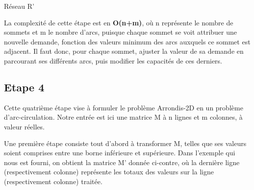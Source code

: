 \documentclass[letterpaper,12pt]{article}
\begin{document}
\begin{center}

Réseau R'
\end{center}

La complexité de cette étape est en \textbf{O(n+m)}, où n représente le nombre de sommets et m le nombre d'arcs, puisque chaque sommet se voit attribuer une nouvelle demande, fonction des valeurs minimum des arcs auxquels ce sommet est adjacent. Il faut donc, pour chaque sommet, ajuster la valeur de sa demande en parcourant ses différents arcs, puis modifier les capacités de ces derniers.

\subsection{Etape 4}

Cette quatrième étape vise à formuler le problème Arrondis-2D en un problème d'arc-circulation.
Notre entrée est ici une matrice M à n lignes et m colonnes, à valeur réelles.

Une première étape consiste tout d'abord à transformer M, telles que ses valeurs soient comprises entre une borne inférieure et supérieure. Dans l'exemple qui nous est fourni, on obtient la matrice M' donnée ci-contre, où la dernière ligne (respectivement colonne) représente les totaux des valeurs sur la ligne (respectivement colonne) traitée. 
\end{document}
